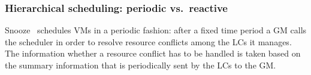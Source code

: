 

\subsubsection{Hierarchical scheduling: periodic vs.\  reactive}

Snooze~\cite{feller:ccgrid12} schedules VMs in a periodic fashion:
after a fixed time period a GM calls the scheduler in order to resolve
resource conflicts among the LCs it manages. The information whether a
resource conflict has to be handled is taken based on the summary
information that is periodically sent by the LCs to the GM.


